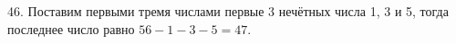 46. Поставим первыми тремя числами первые 3 нечётных числа 1, 3 и 5, тогда последнее число равно $56-1-3-5=47.$\\
